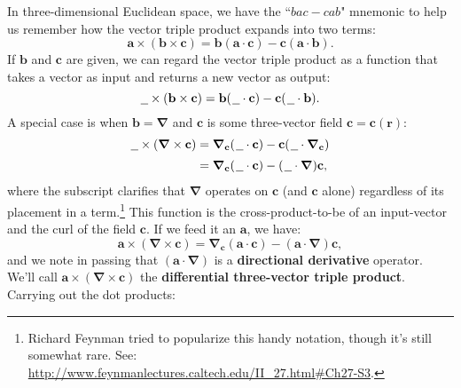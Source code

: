 \documentclass[12pt]{article}
\renewcommand{\vv}[1]{\mathbf{#1}}
\newcommand{\del}{\boldsymbol{\nabla}}
\begin{document}
In three-dimensional Euclidean space, we have the ``$bac - cab$" mnemonic to help us remember how the vector triple product expands into two terms:
\begin{equation*}
\vv a \times (\vv b \times \vv c) = \vv b (\vv a \cdot \vv c) - \vv c (\vv a \cdot \vv b).
\end{equation*}
If $\vv b$ and $\vv c$ are given, we can regard the vector triple product as a function that takes a vector as input and returns a new vector as output:
\begin{equation*}
\text{\underline{\hspace{.6em}}} \times (\vv b \times \vv c) = \vv b ( \mkern1.5mu \text{\underline{\hspace{.6em}}} \cdot \vv c ) - \vv c ( \mkern1.5mu \text{\underline{\hspace{.6em}}} \cdot \vv b ).
\end{equation*}
A special case is when $\vv b = \del$ and $\vv c$ is some three-vector field $\vv c = \vv c (\vv r)$:
\begin{equation}\label{eq:cc}
\begin{split}
\text{\underline{\hspace{.6em}}} \times (\del \times \vv c) &= \del_{\vv c} ( \mkern1.5mu \text{\underline{\hspace{.6em}}} \cdot \vv c ) - \vv c ( \mkern1.5mu \text{\underline{\hspace{.6em}}} \cdot \del_{\vv c} ) \\[2pt]
&= \del_{\vv c} ( \mkern1.5mu \text{\underline{\hspace{.6em}}} \cdot \vv c ) - ( \mkern1.5mu \text{\underline{\hspace{.6em}}} \cdot \del ) \vv c ,
\end{split}
\end{equation}
where the subscript clarifies that $\del$ operates on $\vv c$ (and $\vv c$ alone) regardless of its placement in a term.\footnote{Richard Feynman tried to popularize this handy notation, though it's still somewhat rare. See: \url{http://www.feynmanlectures.caltech.edu/II_27.html\#Ch27-S3}.} This function is the cross-product-to-be of an input-vector and the curl of the field $\vv c$. If we feed it an $\vv a$, we have:
\begin{equation*}
\vv a \times (\del \times \vv c) = \del_{\vv c} ( \vv a \cdot \vv c ) - ( \vv a \cdot \del ) \vv c ,
\end{equation*}
and we note in passing that $(\vv a \cdot \del)$ is a \textbf{directional derivative} operator. We'll call $\vv a \times (\del \times \vv c)$ the \textbf{differential three-vector triple product}. Carrying out the dot products:
\end{document}
